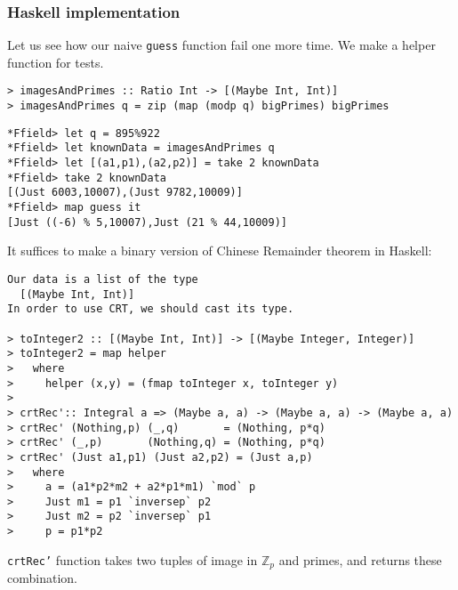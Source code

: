 \documentclass[11pt]{book}
\begin{document}
\subsubsection{Haskell implementation}
Let us see how our naive \texttt{guess} function fail one more time.
We make a helper function for tests.
\begin{verbatim}
> imagesAndPrimes :: Ratio Int -> [(Maybe Int, Int)]
> imagesAndPrimes q = zip (map (modp q) bigPrimes) bigPrimes
\end{verbatim}

\begin{verbatim}
*Ffield> let q = 895%922
*Ffield> let knownData = imagesAndPrimes q
*Ffield> let [(a1,p1),(a2,p2)] = take 2 knownData
*Ffield> take 2 knownData
[(Just 6003,10007),(Just 9782,10009)]
*Ffield> map guess it
[Just ((-6) % 5,10007),Just (21 % 44,10009)]
\end{verbatim}

It suffices to make a binary version of Chinese Remainder theorem in Haskell:
\begin{verbatim}
Our data is a list of the type
  [(Maybe Int, Int)]
In order to use CRT, we should cast its type.

> toInteger2 :: [(Maybe Int, Int)] -> [(Maybe Integer, Integer)]
> toInteger2 = map helper
>   where 
>     helper (x,y) = (fmap toInteger x, toInteger y)
>
> crtRec':: Integral a => (Maybe a, a) -> (Maybe a, a) -> (Maybe a, a)
> crtRec' (Nothing,p) (_,q)       = (Nothing, p*q)
> crtRec' (_,p)       (Nothing,q) = (Nothing, p*q)
> crtRec' (Just a1,p1) (Just a2,p2) = (Just a,p)
>   where
>     a = (a1*p2*m2 + a2*p1*m1) `mod` p
>     Just m1 = p1 `inversep` p2 
>     Just m2 = p2 `inversep` p1
>     p = p1*p2

\end{verbatim}
\texttt{crtRec'} function takes two tuples of image in $\mathbb{Z}_p$ and primes, and returns these combination.
\end{document}
